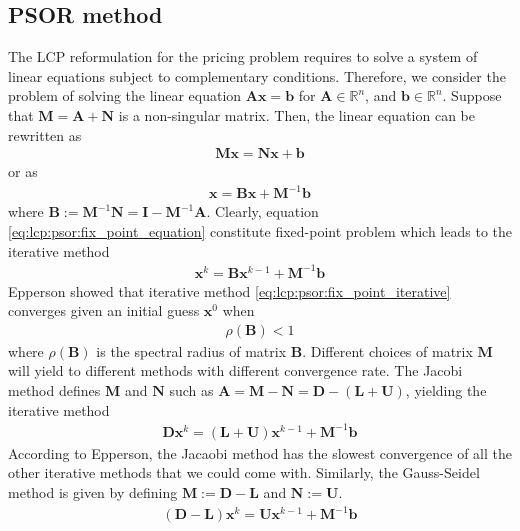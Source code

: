 \subsection{PSOR method}
The LCP reformulation for the pricing problem requires to solve a system of linear equations subject to complementary conditions. Therefore, we consider the problem of solving the linear equation $\mathbf{A}\mathbf{x}=\mathbf{b}$ for $\mathbf{A}\in\mathbb{R}^n$, and $\mathbf{b}\in\mathbb{R}^n$. Suppose that $\mathbf{M} = \mathbf{A} + \mathbf{N}$ is a non-singular matrix. Then, the linear equation can be rewritten as
\begin{align}
  \mathbf{M}\mathbf{x}=\mathbf{N}\mathbf{x} + \mathbf{b}
\end{align}
or as 
\begin{align}
  \label{eq:lcp:psor:fix_point_equation}
  \mathbf{x} = \mathbf{B}\mathbf{x} + \mathbf{M}^{-1}\mathbf{b}
\end{align}
where $\mathbf{B} := \mathbf{M}^{-1}\mathbf{N} = \mathbf{I}-\mathbf{M}^{-1}\mathbf{A}$. Clearly, equation \eqref{eq:lcp:psor:fix_point_equation} constitute fixed-point problem\cite{epperson_2013} which leads to the iterative method
\begin{align}
  \label{eq:lcp:psor:fix_point_iterative}
  \mathbf{x}^{k} = \mathbf{B}\mathbf{x}^{k-1} + \mathbf{M}^{-1}\mathbf{b}
\end{align}
Epperson\cite{epperson_2013} showed that iterative method \eqref{eq:lcp:psor:fix_point_iterative} converges given an initial guess $\mathbf{x}^{0}$ when
\begin{align*}
  \rho(\mathbf{B}) < 1
\end{align*}
where $\rho(\mathbf{B})$ is the spectral radius of matrix $\mathbf{B}$. Different choices of matrix $\mathbf{M}$ will yield to different methods with different convergence rate. The Jacobi method defines $\mathbf{M}$ and $\mathbf{N}$ such as $\mathbf{A}=\mathbf{M}-\mathbf{N}=\mathbf{D} - (\mathbf{L} + \mathbf{U})$, yielding the iterative method
\begin{align}
  \mathbf{D}\mathbf{x}^{k} = (\mathbf{L} + \mathbf{U})\mathbf{x}^{k-1} + \mathbf{M}^{-1}\mathbf{b}
\end{align}
According to Epperson\cite{epperson_2013}, the Jacaobi method has the slowest convergence of all the other iterative methods that we could come with. Similarly, the Gauss-Seidel method is given by defining $\mathbf{M} := \mathbf{D} - \mathbf{L}$ and $\mathbf{N}:=\mathbf{U}$.
\begin{align}
  \label{eq:lcp:psor:gauss_seydel}
  (\mathbf{D} - \mathbf{L})\mathbf{x}^{k} = \mathbf{U}\mathbf{x}^{k-1} + \mathbf{M}^{-1}\mathbf{b}
\end{align}
